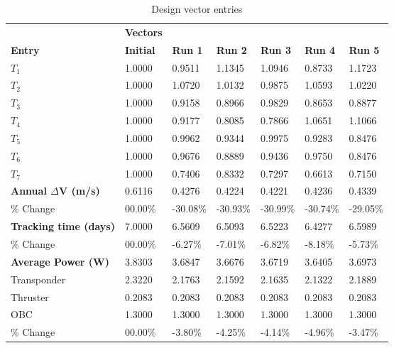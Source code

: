 \begin{table}[H]
\centering
\begin{tabular}{lllllll}
\textbf{} & \cellcolor[HTML]{EFEFEF}\textbf{Vectors} & \textbf{} & \textbf{} & \textbf{} & \textbf{} & \textbf{} \\
\rowcolor[HTML]{EFEFEF} \cellcolor[HTML]{EFEFEF}\textbf{Entry} & \cellcolor[HTML]{EFEFEF}\textbf{Initial} & \cellcolor[HTML]{EFEFEF}\textbf{Run 1} & \cellcolor[HTML]{EFEFEF}\textbf{Run 2} & \cellcolor[HTML]{EFEFEF}\textbf{Run 3} & \cellcolor[HTML]{EFEFEF}\textbf{Run 4} & \cellcolor[HTML]{EFEFEF}\textbf{Run 5} \\
$T_{1}$ & 1.0000 & 0.9511 & 1.1345 & 1.0946 & 0.8733 & 1.1723 \\
$T_{2}$ & 1.0000 & 1.0720 & 1.0132 & 0.9875 & 1.0593 & 1.0220 \\
$T_{3}$ & 1.0000 & 0.9158 & 0.8966 & 0.9829 & 0.8653 & 0.8877 \\
$T_{4}$ & 1.0000 & 0.9177 & 0.8085 & 0.7866 & 1.0651 & 1.1066 \\
$T_{5}$ & 1.0000 & 0.9962 & 0.9344 & 0.9975 & 0.9283 & 0.8476 \\
$T_{6}$ & 1.0000 & 0.9676 & 0.8889 & 0.9436 & 0.9750 & 0.8476 \\
$T_{7}$ & 1.0000 & 0.7406 & 0.8332 & 0.7297 & 0.6613 & 0.7150 \\
\rowcolor[HTML]{EFEFEF} 
\cellcolor[HTML]{EFEFEF}\textbf{Annual $\Delta \boldsymbol{V}$ (m/s)} & \cellcolor[HTML]{EFEFEF}0.6116 & 0.4276 & 0.4224 & 0.4221 & 0.4236 & 0.4339 \\
\% Change & 00.00\% &-30.08\% & -30.93\% & -30.99\% & -30.74\% & -29.05\% \\
\rowcolor[HTML]{EFEFEF} 
\cellcolor[HTML]{EFEFEF}\textbf{Tracking time (days)} & \cellcolor[HTML]{EFEFEF}7.0000 & 6.5609 & 6.5093 & 6.5223 & 6.4277 & 6.5989 \\
\% Change & 00.00\% &-6.27\% & -7.01\% & -6.82\% & -8.18\% & -5.73\% \\
\rowcolor[HTML]{EFEFEF} 
\cellcolor[HTML]{EFEFEF}\textbf{Average Power (W)} & \cellcolor[HTML]{EFEFEF}3.8303 & 3.6847 & 3.6676 & 3.6719 & 3.6405 & 3.6973 \\
Transponder & 2.3220 & 2.1763 & 2.1592 & 2.1635 & 2.1322 & 2.1889 \\
Thruster & 0.2083 & 0.2083 & 0.2083 & 0.2083 & 0.2083 & 0.2083 \\
OBC & 1.3000 & 1.3000 & 1.3000 & 1.3000 & 1.3000 & 1.3000 \\
\% Change & 00.00\% &-3.80\% & -4.25\% & -4.14\% & -4.96\% & -3.47\% \\
\end{tabular}
\caption{Design vector entries}
\label{tab:DesignVectorEntries_default28dur1len3int}
\end{table}